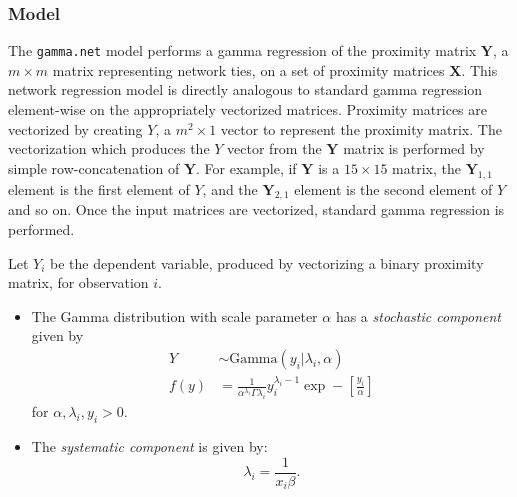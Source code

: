  
 
\subsubsection{Model} 
The {\tt gamma.net} model performs a gamma regression of the proximity matrix $\mathbf{Y}$, a $m \times m$ matrix representing network ties, on a set of proximity matrices $\mathbf{X}$. This network regression model is directly analogous to standard gamma regression element-wise on the appropriately vectorized matrices. Proximity matrices are vectorized by creating $Y$, a $m^2 \times 1$ vector to represent the proximity matrix. The vectorization which produces the $Y$ vector from the $\mathbf{Y}$ matrix is performed by simple row-concatenation of $\mathbf{Y}$. For example, if $\mathbf{Y}$ is a $15 \times 15$ matrix, the $\mathbf{Y}_{1,1}$ element is the first element of $Y$, and the $\mathbf{Y}_{2,1}$ element is the second element of $Y$ and so on. Once the input matrices are vectorized, standard gamma regression is performed.  
 
Let $Y_{i}$ be the dependent variable, produced by vectorizing a binary proximity matrix, for observation $i$. 
\begin{itemize} 
\item The Gamma distribution with scale parameter $\alpha$ has a \emph{stochastic component} given by  
\begin{eqnarray*} 
Y &\sim  \text{Gamma} ( y_{i} | \lambda_i, \alpha)\\ 
f(y) & = \frac{1}{\alpha^{\lambda_i}\Gamma \lambda_i} y_i^{\lambda_i - 1} \exp - \left[ \frac{y_i}{\alpha} \right] 
\end{eqnarray*} 
for $\alpha, \lambda_i, y_i > 0$. 
\item The \emph{systematic component} is given by: 
\begin{equation*} 
\lambda_{i} =  \frac{1}{x_{i}\beta}. 
\end{equation*} 
 
\end{itemize} 
 
 
